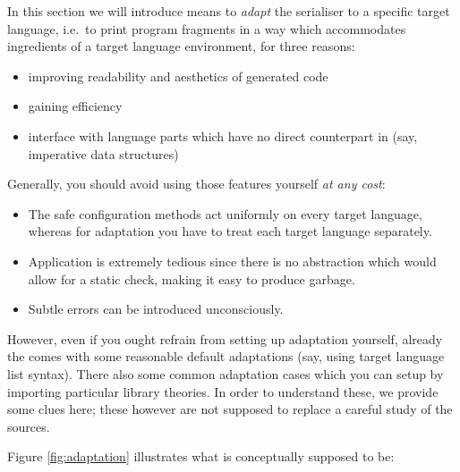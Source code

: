 \begin{isabellebody}
\begin{isamarkuptext}
\begin{itemize}
  \end{itemize}

  \noindent In this section we will introduce means to \emph{adapt}
  the serialiser to a specific target language, i.e.~to print program
  fragments in a way which accommodates 
  ingredients of a target language environment, for three reasons:

  \begin{itemize}
    \item improving readability and aesthetics of generated code
    \item gaining efficiency
    \item interface with language parts which have no direct counterpart
      in  (say, imperative data structures)
  \end{itemize}

  \noindent Generally, you should avoid using those features yourself
  \emph{at any cost}:

  \begin{itemize}

    \item The safe configuration methods act uniformly on every target
      language, whereas for adaptation you have to treat each target
      language separately.

    \item Application is extremely tedious since there is no
      abstraction which would allow for a static check, making it easy
      to produce garbage.

    \item Subtle errors can be introduced unconsciously.

  \end{itemize}

  \noindent However, even if you ought refrain from setting up
  adaptation yourself, already the  comes with some
  reasonable default adaptations (say, using target language list
  syntax).  There also some common adaptation cases which you can
  setup by importing particular library theories.  In order to
  understand these, we provide some clues here; these however are not
  supposed to replace a careful study of the sources.%
\end{isamarkuptext}%
\isamarkuptrue%
%
\isamarkuptrue%
%
\begin{isamarkuptext}%
Figure \ref{fig:adaptation} illustrates what  is
  conceptually supposed to be:


\end{isamarkuptext}
\end{isabellebody}
